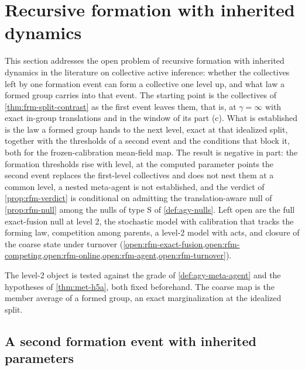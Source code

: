 \section{Recursive formation with inherited dynamics}\label{sec:rfm}

This section addresses the open problem of recursive formation with inherited dynamics in the literature on collective active inference: whether the collectives left by one formation event can form a collective one level up, and what law a formed group carries into that event. The starting point is the collectives of \cref{thm:frm-split-contrast} as the first event leaves them, that is, at $\gamma=\infty$ with exact in-group translations and in the window of its part (c). What is established is the law a formed group hands to the next level, exact at that idealized split, together with the thresholds of a second event and the conditions that block it, both for the frozen-calibration mean-field map. The result is negative in part: the formation thresholds rise with level, at the computed parameter points the second event replaces the first-level collectives and does not nest them at a common level, a nested meta-agent is not established, and the verdict of \cref{prop:rfm-verdict} is conditional on admitting the translation-aware null of \cref{prop:rfm-null} among the nulls of type S of \cref{def:agy-nulls}. Left open are the full exact-fusion null at level 2, the stochastic model with calibration that tracks the forming law, competition among parents, a level-2 model with acts, and closure of the coarse state under turnover (\cref{open:rfm-exact-fusion,open:rfm-competing,open:rfm-online,open:rfm-agent,open:rfm-turnover}).

The level-2 object is tested against the grade of \cref{def:agy-meta-agent} and the hypotheses of \cref{thm:met-h5a}, both fixed beforehand. The coarse map is the member average of a formed group, an exact marginalization at the idealized split.

\subsection{A second formation event with inherited parameters}\label{sec:rfm-inheritance}

